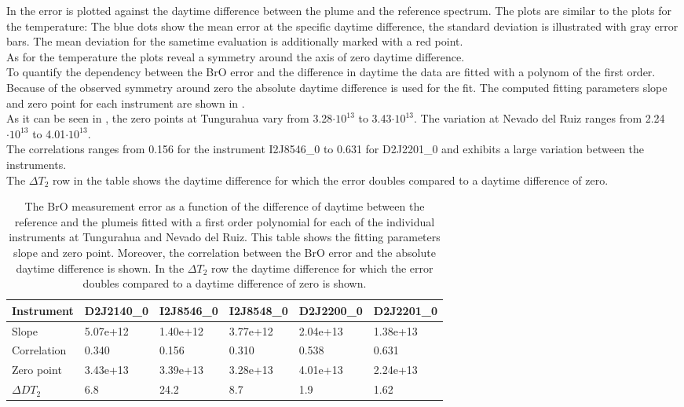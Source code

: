 In  the  error is plotted against the daytime difference between the plume and the reference spectrum. The plots are similar to the plots for the temperature: The blue dots show the mean  error at the specific daytime difference, the standard deviation is illustrated with gray error bars. The mean  deviation for the sametime evaluation is additionally marked with a red point. \\
As for the temperature the plots reveal a symmetry around the axis of zero daytime difference.\\
%
To quantify the dependency between the BrO error and the difference in daytime the data are fitted with a polynom of the first order. Because of the observed symmetry around zero the absolute daytime difference is used for the fit. The computed fitting parameters slope and zero point for each instrument are shown in . \\
%
As it can be seen in , the zero points at Tungurahua vary from 3.28$\cdot10^{13}$ to 3.43$\cdot10^{13}$. The variation at Nevado del Ruiz ranges from  2.24$\cdot10^{13}$ to 4.01$\cdot10^{13}$. \\
The correlations ranges from 0.156 for the instrument I2J8546\_0 to  0.631 for D2J2201\_0 and exhibits a large variation between the instruments.\\
The $\Delta T_{2}$ row in the table shows the daytime difference for which the error doubles compared to a daytime difference of zero.
	\begin{table}[h]
	\begin{tabular}{|p{2cm}|p{2cm}|p{2cm}|p{2cm}|p{2cm}|p{2cm}|}
		Instrument	&D2J2140\_0&I2J8546\_0& I2J8548\_0&D2J2200\_0&D2J2201\_0\\
		\toprule
		Slope&5.07e+12&1.40e+12 &3.77e+12 &2.04e+13& 1.38e+13\\
		\midrule
		Correlation&
		0.340&
		0.156&
		0.310&
		0.538&
		0.631\\
		\midrule
		Zero point& 3.43e+13&3.39e+13&3.28e+13&  4.01e+13&  2.24e+13\\
		\midrule
		$\Delta DT_{2}$&6.8&24.2&8.7&1.9&1.62\\
		\bottomrule
	\end{tabular}
	\label{tab:dtcalc}
	\caption{The BrO measurement error as a function of the difference of daytime between the reference and the plumeis fitted with a first order polynomial for each of the individual instruments at Tungurahua and Nevado del Ruiz. This table shows the fitting parameters slope and zero point. Moreover, the correlation between the BrO error and the absolute daytime difference is shown. In the $\Delta T_{2}$ row the daytime difference for which the error doubles compared to a daytime difference of zero is shown.}
\end{table}

